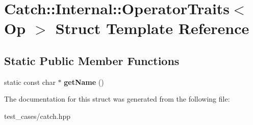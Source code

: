 \hypertarget{structCatch_1_1Internal_1_1OperatorTraits}{}\section{Catch\+:\+:Internal\+:\+:Operator\+Traits$<$ Op $>$ Struct Template Reference}
\label{structCatch_1_1Internal_1_1OperatorTraits}
\subsection*{Static Public Member Functions}
\begin{DoxyCompactItemize}
\item 
\mbox{\label{structCatch_1_1Internal_1_1OperatorTraits_ac6d08082ea33348d42bc4ccbd6d07671}} 
static const char $\ast$ {\bfseries get\+Name} ()
\end{DoxyCompactItemize}


The documentation for this struct was generated from the following file\+:\begin{DoxyCompactItemize}
\item 
test\+\_\+cases/catch.\+hpp\end{DoxyCompactItemize}

